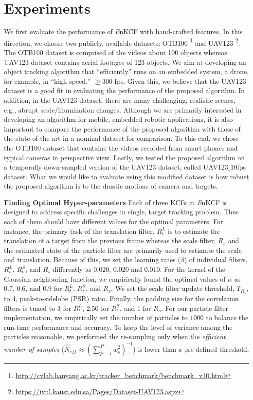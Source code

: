\documentclass[10pt,twocolumn,letterpaper]{article}
\begin{document}
\section{Experiments} \label{sc:Experiments}
We first evaluate the performance of {\it E}nKCF with hand-crafted features.
In this direction, we choose two publicly, available datasets:
OTB100 \footnote{\url{http://cvlab.hanyang.ac.kr/tracker_benchmark/benchmark_v10.html}}
and UAV123 \footnote{\url{https://ivul.kaust.edu.sa/Pages/Dataset-UAV123.aspx}}\cite{mueller2016uav123}.
The OTB100 dataset is comprised of the videos about 100 objects
whereas UAV123 dataset contains aerial footages of 123 objects. We aim
at developing an object tracking algorithm that ``efficiently'' runs
on an embedded system, a drone, for example, in ``high speed,'' $\ge
300$ fps. Given this, we believe that the UAV123 dataset is a good fit in
evaluating the performance of the proposed algorithm. In addition, in
the UAV123 dataset, there are many challenging, realistic scenes, e.g.,
abrupt scale/illumination changes. Although we are primarily
interested in developing an algorithm for mobile, embedded robotic
applications, it is also important to compare the performance of the
proposed algorithm with those of the state-of-the-art in a nominal
dataset for comparison. To this end, we chose the OTB100 dataset that
contains the videos recorded from smart phones and typical cameras in
perspective view. Lastly, we tested the proposed algorithm on a
temporally down-sampled version of the UAV123 dataset, called
UAV123$\_$10fps dataset. What we would like to evaluate using this
modified dataset is how robust the proposed algorithm is to the
drastic motions of camera and targets.

\textbf{Finding Optimal Hyper-parameters} Each of three KCFs in {\it
  E}nKCF is designed to address specific challenges in single, target
tracking problem. Thus each of them should have different values for
the optimal parameters. For instance, the primary task of the
translation filter, $R_{t}^{L}$ is to estimate the translation of a
target from the previous frame whereas the scale filter, $R_{s}$ and
the estimated state of the particle filter are primarily used to
estimate the scale and translation. Because of this, we set the
learning rates ($\beta$) of individual filters, $R_{t}^{L}$,
$R_{t}^{S}$, and $R_{s}$ differently as $0.020$, $0.020$ and
$0.010$. For the kernel of the Gaussian neighboring function, we
empirically found the optimal values of $\alpha$ as $0.7$, $0.6$, and
$0.9$ for $R_{t}^{L}$, $R_{t}^{S}$, and $R_{s}$. We set the scale
filter update threshold, $T_{R_{s}}$, to 4, peak-to-sidelobe (PSR)
ratio. Finally, the padding size for the correlation filters is tuned
to $3$ for $R_{t}^{L}$, $2.50$ for $R_{t}^{S}$, and $1$ for
$R_{s}$. For our particle filter implementation, we empirically set
the number of particles to $1000$ to balance the run-time performance
and accuracy. To keep the level of variance among the particles
reasonable, we performed the re-sampling only when the
\textit{efficient number of samples} ($ \hat{N}_{eff} \approx
(\sum_{p=1}^{P}w_{p}^{2})^{-1} $) is lower than a pre-defined
threshold.
\end{document}
